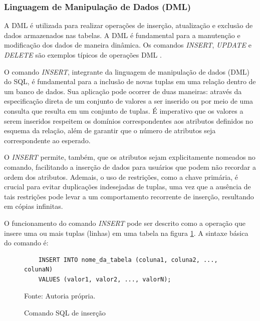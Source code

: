 \subsubsection{Linguagem de Manipulação de Dados (DML)}

A DML é utilizada para realizar operações de inserção, atualização e exclusão de dados armazenados nas tabelas. A DML é fundamental para a manutenção e modificação dos dados de maneira dinâmica. Os comandos \textit{INSERT}, \textit{UPDATE} e \textit{DELETE} são exemplos típicos de operações DML \cite{silberschatz2011database}.


O comando \textit{INSERT}, integrante da linguagem de manipulação de dados (DML) do SQL, é fundamental para a inclusão de novas tuplas em uma relação dentro de um banco de dados. Sua aplicação pode ocorrer de duas maneiras: através da especificação direta de um conjunto de valores a ser inserido ou por meio de uma consulta que resulta em um conjunto de tuplas. É imperativo que os valores a serem inseridos respeitem os domínios correspondentes aos atributos definidos no esquema da relação, além de garantir que o número de atributos seja correspondente ao esperado.\cite{silberschatz2011database} 

O \textit{INSERT} permite, também, que os atributos sejam explicitamente nomeados no comando, facilitando a inserção de dados para usuários que podem não recordar a ordem dos atributos. Ademais, o uso de restrições, como a chave primária, é crucial para evitar duplicações indesejadas de tuplas, uma vez que a ausência de tais restrições pode levar a um comportamento recorrente de inserção, resultando em cópias infinitas.\cite{silberschatz2011database}

O funcionamento do comando \textit{INSERT} pode ser descrito como a operação que insere uma ou mais tuplas (linhas) em uma tabela na figura \ref{lst:sql_insert}. A sintaxe básica do comando é:

\begin{figure}[H]
    \centering
    \begin{lstlisting}
    INSERT INTO nome_da_tabela (coluna1, coluna2, ..., colunaN) 
    VALUES (valor1, valor2, ..., valorN);
    \end{lstlisting}
    \caption{Comando SQL de inserção}
    Fonte: Autoria própria.
    \label{lst:sql_insert}
\end{figure}



